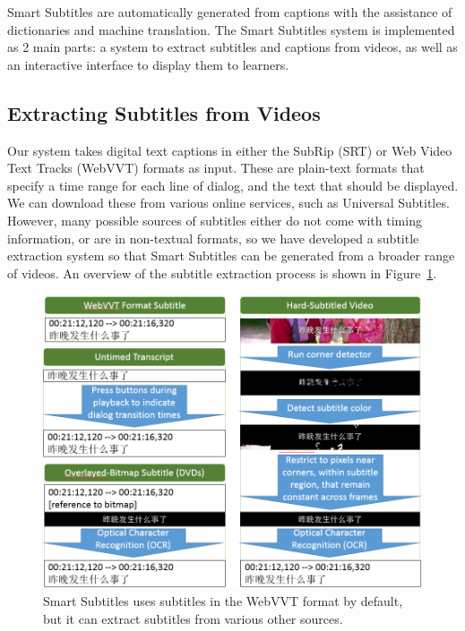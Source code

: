 \documentclass{sigchi}
\begin{document}
Smart Subtitles are automatically generated from 
captions with the assistance of dictionaries and 
machine translation. The Smart Subtitles system
is implemented as 2 main parts:
a system to extract subtitles and captions from videos, as well as an interactive interface to display them to learners.

\subsection{Extracting Subtitles from Videos}

Our system takes digital text captions in either the 
SubRip (SRT) or Web Video Text Tracks (WebVVT) formats as input.
These are plain-text formats that specify a time range for each 
line of dialog, and the text that should be displayed.
We can download these from
various online services, such as Universal Subtitles.
However, many possible sources of subtitles either
do not come with timing information, or are in
non-textual formats, so we have developed 
a subtitle extraction system so that Smart Subtitles
can be generated from a broader range of videos.
An overview of the subtitle extraction process
is shown in Figure~\ref{fig:figure3}.

\begin{figure}[!h]
\centering
\includegraphics[width=\columnwidth]{subtitle-sources}
\caption{Smart Subtitles uses subtitles in the WebVVT format
by default, but it can extract subtitles from various other sources.}
\label{fig:figure3}
\end{figure}
\end{document}
